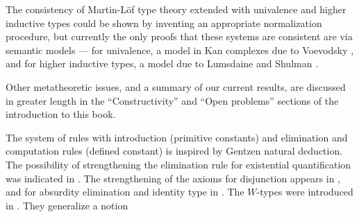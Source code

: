 The consistency of Martin-L\"{o}f type theory extended with univalence and higher
inductive types could be shown by inventing an appropriate normalization procedure, but currently
the only proofs that these systems are consistent are via semantic models --- for
univalence, a model in Kan complexes due to Voevodsky \cite{klv:ssetmodel}, and
for higher inductive types, a model due to Lumsdaine and Shulman \cite{ls:hits}.

Other metatheoretic issues, and a summary of our current results, are discussed
in greater length in the ``Constructivity'' and ``Open problems'' sections of
the introduction to this book.

%

\sectionNotes\label{subsec:general-remarks}


The system of rules with introduction (primitive constants) and elimination
and computation rules (defined constant) is inspired by Gentzen natural
deduction. The possibility of strengthening the elimination rule for
existential quantification was indicated in \cite{howard:pat}. The
strengthening of the axioms for disjunction appears in \cite{Martin-Lof-1972},
and for absurdity elimination and identity type in \cite{Martin-Lof-1973}. The
$W$-types were introduced in \cite{Martin-Lof-1979}. They generalize a notion
